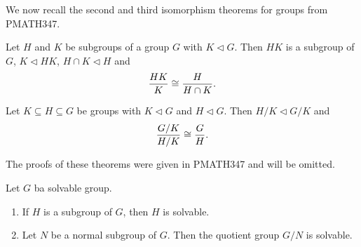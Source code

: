 \documentclass[11pt]{article}
\begin{document}
We now recall the second and third isomorphism theorems for groups from PMATH347.

\begin{theorem}
    Let $H$ and $K$ be subgroups of a group $G$ with $K\lhd G$. Then $HK$ is a subgroup of $G$, $K\lhd HK$, $H\cap K\lhd H$ and
    \[\frac{HK}{K}\cong\frac{H}{H\cap K}.\]
\end{theorem}

\begin{theorem}
    Let $K\subseteq H\subseteq G$ be groups with $K\lhd G$ and $H\lhd G$. Then $H/K\lhd G/K$ and
    \[\frac{G/K}{H/K}\cong\frac{G}{H}.\]
\end{theorem}

The proofs of these theorems were given in PMATH347 and will be omitted.

\begin{theorem}
    Let $G$ ba solvable group.
    \begin{enumerate}
        \item If $H$ is a subgroup of $G$, then $H$ is solvable.
        \item Let $N$ be a normal subgroup of $G$. Then the quotient group $G/N$ is solvable.
    \end{enumerate}
\end{theorem}
\end{document}
